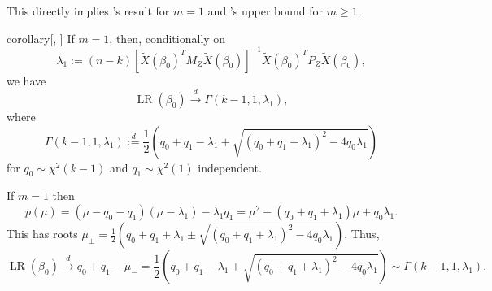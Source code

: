 \documentclass[11pt,hidelinks,a4paper]{article}
\DeclareMathOperator{\LR}{LR}
\newcommand{\tod}{\overset{d}{\to}}
\let\geq\geqslant
\begin{document}
This directly implies \citeauthor{moreira2003conditional}'s \citeyearpar{moreira2003conditional} result for $m=1$ and \citeauthor{kleibergen2007generalizing}'s \citeyearpar{kleibergen2007generalizing} upper bound for $m \geq 1$.
\begin{theoremEnd}[one big link translated={\hspace{-0.71cm} See proof on page}]{corollary}[\citeauthor{moreira2003conditional}, \citeyear{moreira2003conditional}]
    \label{cor:1}
    If $m=1$, then, conditionally on 
    $$\lambda_1 := (n - k) \left[ \tilde X(\beta_0)^T M_Z \tilde X(\beta_0) \right]^{-1} \tilde X(\beta_0)^T P_Z \tilde X(\beta_0),$$
    we have
    $$
    \LR(\beta_0) \tod \Gamma(k - 1, 1, \lambda_1),
    $$
    where 
    $$\Gamma(k - 1, 1, \lambda_1) \overset{d}{:=} \frac{1}{2} (q_0 + q_1 - \lambda_1 + \sqrt{(q_0 + q_1 + \lambda_1)^2 - 4 q_0 \lambda_1})$$
    for $q_0 \sim \chi^2(k - 1)$ and $q_1 \sim \chi^2(1)$ independent.
\end{theoremEnd}
\begin{proofEnd}
    If $m=1$ then
    $$p(\mu) = (\mu - q_0 - q_1)(\mu - \lambda_1) - \lambda_1 q_1 = \mu^2 - (q_0 + q_1 + \lambda_1) \mu + q_0 \lambda_1.$$
    This has roots $\mu_\pm = \frac{1}{2} (q_0 + q_1 + \lambda_1 \pm \sqrt{(q_0 + q_1 + \lambda_1)^2 - 4 q_0 \lambda_1})$.
    Thus, 
    $$
    \LR(\beta_0) \tod q_0 + q_1 - \mu_- = \frac{1}{2} \left(q_0 + q_1 -  \lambda_1 + \sqrt{(q_0 + q_1 + \lambda_1)^2 - 4 q_0 \lambda_1}\right) \sim \Gamma(k - 1, 1, \lambda_1).
    $$
\end{proofEnd}
\end{document}
